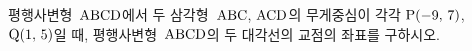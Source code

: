 평행사변형~$\mathrm{ABCD}$에서 두 삼각형~$\mathrm{ABC}$, $\mathrm{ACD}$의 무게중심이 각각 $\mathrm{P}(-9,\mkern3mu 7)$, $\mathrm{Q}(1,\mkern3mu 5)$일 때, 평행사변형~$\mathrm{ABCD}$의 두 대각선의 교점의 좌표를 구하시오.
